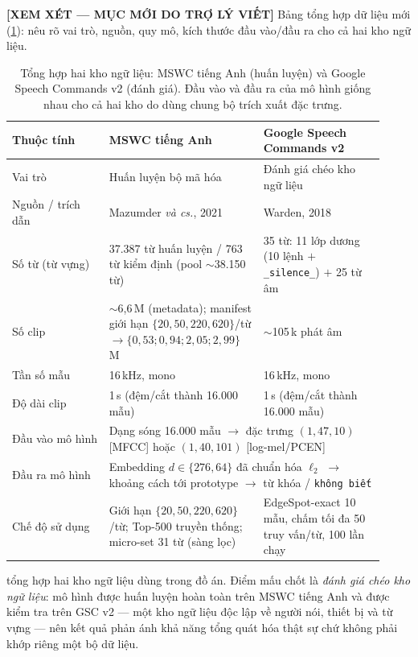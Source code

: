 \documentclass[12pt,a4paper]{report}
\newcommand{\reviewnote}[1]{%
    \par\smallskip\noindent
    \colorbox{yellow!35}{\parbox{0.97\linewidth}{\small\textbf{[XEM XÉT — MỤC MỚI DO TRỢ LÝ VIẾT]}\; #1}}%
    \par\smallskip}
\newcommand{\reviewnote}[1]{}
\newcommand{\code}[1]{\texttt{\small #1}}
\begin{document}
\reviewnote{Bảng tổng hợp dữ liệu mới (\ref{tab:datasets}): nêu rõ vai trò, nguồn,
quy mô, kích thước đầu vào/đầu ra cho cả hai kho ngữ liệu.}

\begin{table}[H]
\centering
\caption{Tổng hợp hai kho ngữ liệu: MSWC tiếng Anh (huấn luyện) và Google Speech
Commands v2 (đánh giá). Đầu vào và đầu ra của mô hình giống nhau cho cả hai kho do
dùng chung bộ trích xuất đặc trưng.}
\label{tab:datasets}
\small
\setlength{\tabcolsep}{4pt}
\begin{tabular}{p{0.24\linewidth} p{0.38\linewidth} p{0.30\linewidth}}
\toprule
\textbf{Thuộc tính} & \textbf{MSWC tiếng Anh} & \textbf{Google Speech Commands v2}\\
\midrule
Vai trò        & Huấn luyện bộ mã hóa & Đánh giá chéo kho ngữ liệu \\
Nguồn / trích dẫn & Mazumder \emph{và cs.}, 2021~\cite{mazumder2021mswc} &
                 Warden, 2018~\cite{warden2018speech} \\
Số từ (từ vựng) & 37.387 từ huấn luyện / 763 từ kiểm định (pool $\sim$38.150 từ) &
                 35 từ: 11 lớp dương (10 lệnh $+$ \code{\_silence\_}) $+$ 25 từ âm \\
Số clip        & $\sim$6{,}6\,M (metadata); manifest giới hạn $\{20,50,220,620\}$/từ
                 $\to \{0{,}53; 0{,}94; 2{,}05; 2{,}99\}$\,M &
                 $\sim$105\,k phát âm \\
Tần số mẫu     & 16\,kHz, mono & 16\,kHz, mono \\
Độ dài clip    & 1\,s (đệm/cắt thành 16.000 mẫu) & 1\,s (đệm/cắt thành 16.000 mẫu) \\
Đầu vào mô hình & \multicolumn{2}{p{0.70\linewidth}}{Dạng sóng 16.000 mẫu
                 $\to$ đặc trưng $(1,47,10)$ [MFCC] hoặc $(1,40,101)$ [log-mel/PCEN]} \\
Đầu ra mô hình & \multicolumn{2}{p{0.70\linewidth}}{Embedding $d\in\{276,64\}$ đã
                 chuẩn hóa $\ell_2$ $\to$ khoảng cách tới prototype $\to$ từ khóa /
                 \texttt{không biết}} \\
Chế độ sử dụng & Giới hạn $\{20,50,220,620\}$/từ; Top-500 truyền thống; micro-set
                 31 từ (sàng lọc) & EdgeSpot-exact 10 mẫu, chấm tối đa 50 truy
                 vấn/từ, 100 lần chạy \\
\bottomrule
\end{tabular}
\end{table}

 tổng hợp hai kho ngữ liệu dùng trong đồ án. Điểm mấu chốt là
\emph{đánh giá chéo kho ngữ liệu}: mô hình được huấn luyện hoàn toàn trên MSWC
tiếng Anh và được kiểm tra trên GSC v2 --- một kho ngữ liệu độc lập về người nói,
thiết bị và từ vựng --- nên kết quả phản ánh khả năng tổng quát hóa thật sự chứ
không phải khớp riêng một bộ dữ liệu.
\end{document}
